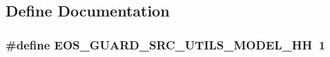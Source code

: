 \subsection{Define Documentation}
\hypertarget{model_8hh_a840a218887d25b75651ba408ae261e9d}{
\subsubsection[{EOS\_\-GUARD\_\-SRC\_\-UTILS\_\-MODEL\_\-HH}]{\setlength{\rightskip}{0pt plus 5cm}\#define EOS\_\-GUARD\_\-SRC\_\-UTILS\_\-MODEL\_\-HH~1}}
\label{model_8hh_a840a218887d25b75651ba408ae261e9d}
